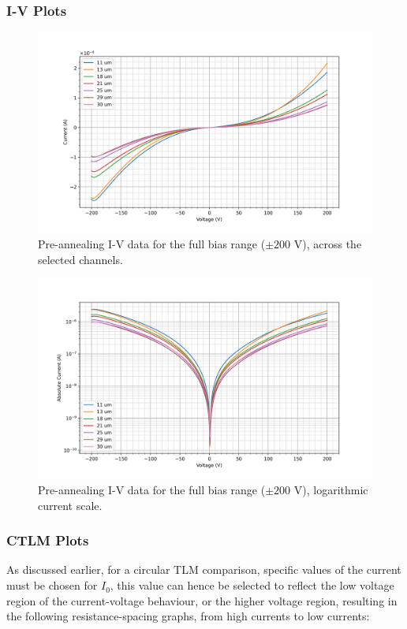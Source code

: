 \subsubsection{I-V Plots}
\begin{figure}[H]
    \centering
    \includegraphics[width=\textwidth]{Chapter3/Figs/Raster/Sample F 2022/Pre-anneal data/lin_scale.png}
    \caption{Pre-annealing I-V data for the full bias range ($\pm200$ \si{\volt}), across the selected channels.}
    \label{fig:pre-anneal-iv-lin-200}
\end{figure}
\begin{figure}[H]
    \centering
    \includegraphics[width=\textwidth]{Chapter3/Figs/Raster/Sample F 2022/Pre-anneal data/log_scale.png}
    \caption{Pre-annealing I-V data for the full bias range ($\pm200$ \si{\volt}), logarithmic current scale.}
    \label{fig:pre-anneal-iv-log-200}
\end{figure}

\subsubsection{CTLM Plots}
As discussed earlier, for a circular TLM comparison, specific values of the current must be chosen for $I_{0}$, this value can hence be selected to reflect the low voltage region of the current-voltage behaviour, or the higher voltage region, resulting in the following resistance-spacing graphs, from high currents to low currents:

